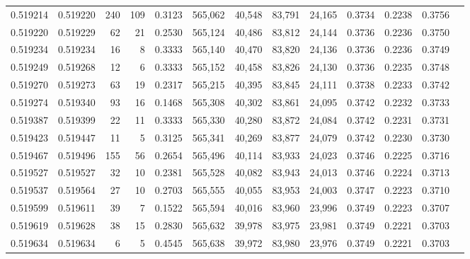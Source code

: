 \begin{tabular}{rrrrrrrrrrrrr}
0.519214 & 0.519220 &   240 &   109 &                                     0.3123 & 565,062 &  40,548 &  83,791 &  24,165 & 0.3734 & 0.2238 & 0.3756 \\
0.519220 & 0.519229 &    62 &    21 &                                     0.2530 & 565,124 &  40,486 &  83,812 &  24,144 & 0.3736 & 0.2236 & 0.3750 \\
0.519234 & 0.519234 &    16 &     8 &                                     0.3333 & 565,140 &  40,470 &  83,820 &  24,136 & 0.3736 & 0.2236 & 0.3749 \\
0.519249 & 0.519268 &    12 &     6 &                                     0.3333 & 565,152 &  40,458 &  83,826 &  24,130 & 0.3736 & 0.2235 & 0.3748 \\
0.519270 & 0.519273 &    63 &    19 &                                     0.2317 & 565,215 &  40,395 &  83,845 &  24,111 & 0.3738 & 0.2233 & 0.3742 \\
0.519274 & 0.519340 &    93 &    16 &                                     0.1468 & 565,308 &  40,302 &  83,861 &  24,095 & 0.3742 & 0.2232 & 0.3733 \\
0.519387 & 0.519399 &    22 &    11 &                                     0.3333 & 565,330 &  40,280 &  83,872 &  24,084 & 0.3742 & 0.2231 & 0.3731 \\
0.519423 & 0.519447 &    11 &     5 &                                     0.3125 & 565,341 &  40,269 &  83,877 &  24,079 & 0.3742 & 0.2230 & 0.3730 \\
0.519467 & 0.519496 &   155 &    56 &                                     0.2654 & 565,496 &  40,114 &  83,933 &  24,023 & 0.3746 & 0.2225 & 0.3716 \\
0.519527 & 0.519527 &    32 &    10 &                                     0.2381 & 565,528 &  40,082 &  83,943 &  24,013 & 0.3746 & 0.2224 & 0.3713 \\
0.519537 & 0.519564 &    27 &    10 &                                     0.2703 & 565,555 &  40,055 &  83,953 &  24,003 & 0.3747 & 0.2223 & 0.3710 \\
0.519599 & 0.519611 &    39 &     7 &                                     0.1522 & 565,594 &  40,016 &  83,960 &  23,996 & 0.3749 & 0.2223 & 0.3707 \\
0.519619 & 0.519628 &    38 &    15 &                                     0.2830 & 565,632 &  39,978 &  83,975 &  23,981 & 0.3749 & 0.2221 & 0.3703 \\
0.519634 & 0.519634 &     6 &     5 &                                     0.4545 & 565,638 &  39,972 &  83,980 &  23,976 & 0.3749 & 0.2221 & 0.3703 \\

\end{tabular}
